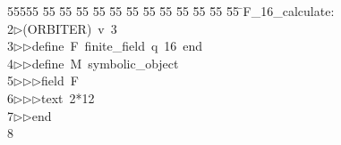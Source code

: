 %
%
\begin{tabbing}
55555 \= 55 \= 55 \= 55 \= 55 \= 55 \= 55 \= 55 \= 55 \= 55 \= 55 \= 55 \= 55 \= \>F\_16\_calculate:\\[0pt]
2\>$\triangleright$\>(ORBITER)\ v\ 3\ \\[0pt]
3\>$\triangleright$\>$\triangleright$\>define\ F\ finite\_field\ q\ 16\ end\ \\[0pt]
4\>$\triangleright$\>$\triangleright$\>define\ M\ symbolic\_object\ \\[0pt]
5\>$\triangleright$\>$\triangleright$\>$\triangleright$\>field\ F\ \\[0pt]
6\>$\triangleright$\>$\triangleright$\>$\triangleright$\>text\ 2*12\ \\[0pt]
7\>$\triangleright$\>$\triangleright$\>end\\[0pt]
8\>\end{tabbing}
